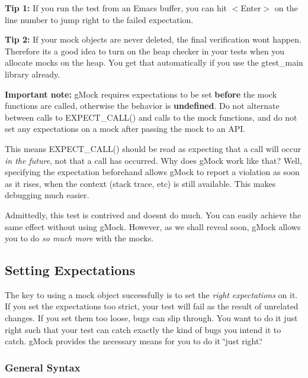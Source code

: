 {\bfseries Tip 1\+:} If you run the test from an Emacs buffer, you can hit {\ttfamily $<$Enter$>$} on the line number to jump right to the failed expectation.

{\bfseries Tip 2\+:} If your mock objects are never deleted, the final verification won\textquotesingle{}t happen. Therefore it\textquotesingle{}s a good idea to turn on the heap checker in your tests when you allocate mocks on the heap. You get that automatically if you use the {\ttfamily gtest\+\_\+main} library already.

{\bfseries Important note\+:} g\+Mock requires expectations to be set {\bfseries before} the mock functions are called, otherwise the behavior is {\bfseries undefined}. Do not alternate between calls to {\ttfamily E\+X\+P\+E\+C\+T\+\_\+\+C\+A\+L\+L()} and calls to the mock functions, and do not set any expectations on a mock after passing the mock to an A\+PI.

This means {\ttfamily E\+X\+P\+E\+C\+T\+\_\+\+C\+A\+L\+L()} should be read as expecting that a call will occur {\itshape in the future}, not that a call has occurred. Why does g\+Mock work like that? Well, specifying the expectation beforehand allows g\+Mock to report a violation as soon as it rises, when the context (stack trace, etc) is still available. This makes debugging much easier.

Admittedly, this test is contrived and doesn\textquotesingle{}t do much. You can easily achieve the same effect without using g\+Mock. However, as we shall reveal soon, g\+Mock allows you to do {\itshape so much more} with the mocks.

\subsection*{Setting Expectations}

The key to using a mock object successfully is to set the {\itshape right expectations} on it. If you set the expectations too strict, your test will fail as the result of unrelated changes. If you set them too loose, bugs can slip through. You want to do it just right such that your test can catch exactly the kind of bugs you intend it to catch. g\+Mock provides the necessary means for you to do it \char`\"{}just
right.\char`\"{}

\subsubsection*{General Syntax}

